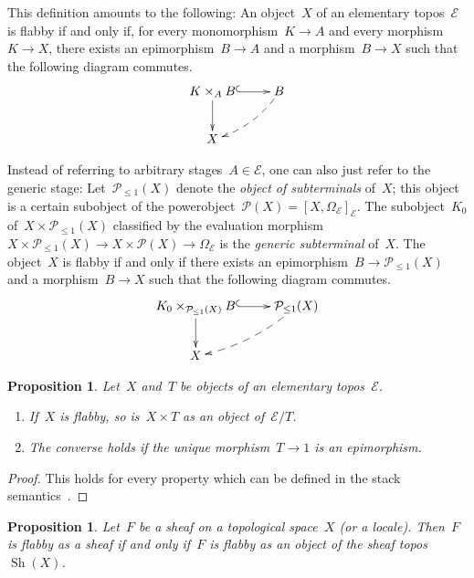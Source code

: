 \documentclass[oneside]{amsart}
\theoremstyle{definition}
\theoremstyle{plain}
\newtheorem{prop}[defn]{Proposition}
\theoremstyle{remark}
\newcommand{\E}{\mathcal{E}}
\renewcommand{\P}{\mathcal{P}}
\DeclareMathOperator{\Sh}{Sh}
\renewcommand{\_}{\mathpunct{.}\,}
\begin{document}
This definition amounts to the following: An object~$X$ of an elementary
topos~$\E$ is flabby if and only if, for every monomorphism~$K \to A$ and every
morphism~$K \to X$, there exists an epimorphism~$B \to A$ and a morphism~$B
\to X$ such that the following diagram commutes.
\[ \xymatrix{
  K \times_A B \ar@{^{(}->}[r]\ar[d] & B \ar@{-->}@/^/[ld] \\
  X
} \]

Instead of referring to arbitrary stages~$A \in \E$, one can also just refer to
the generic stage: Let~$\P_{\leq1}(X)$ denote the \emph{object of subterminals}
of~$X$; this object is a certain subobject of the powerobject~$\P(X) = [X,\Omega_\E]_\E$.
The subobject~$K_0$ of~$X \times \P_{\leq1}(X)$ classified by the
evaluation morphism~$X \times \P_{\leq1}(X) \to X \times \P(X) \to \Omega_\E$
is the \emph{generic subterminal} of~$X$. The object~$X$ is flabby if and only
if there exists an epimorphism~$B \to \P_{\leq1}(X)$ and a morphism~$B \to X$
such that the following diagram commutes.
\[ \xymatrix{
  K_0 \times_{\P_{\leq1}(X)} B \ar@{^{(}->}[r]\ar[d] & \P_{\leq1}(X) \ar@{-->}@/^/[ld] \\
  X
} \]

\begin{prop}\label{prop:basic-properties-of-flabby-objects}
Let~$X$ and~$T$ be objects of an elementary topos~$\E$.
\begin{enumerate}
\item If~$X$ is flabby, so is~$X \times T$ as an object of~$\E/T$.
\item The converse holds if the unique morphism~$T \to 1$ is an epimorphism.
\end{enumerate}
\end{prop}

\begin{proof}This holds for every property which can be defined
in the stack semantics~\cite[Lemma~7.3]{shulman:stack-semantics}.
\end{proof}

\begin{prop}\label{prop:flabby-sheaves-objects}
Let~$F$ be a sheaf on a topological space~$X$ (or a locale).
Then~$F$ is flabby as a sheaf if and only if~$F$ is flabby as an object of the
sheaf topos~$\Sh(X)$.
\end{prop}
\end{document}
